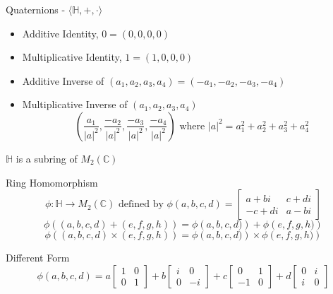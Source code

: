 \documentclass{beamer}
\begin{document}
\begin{frame}{Quaternions - $\langle \mathbb{H},+,\cdot \rangle$}
\begin{itemize}
		\item<4> Additive Identity, $0 = (0,0,0,0)$
		\item<4> Multiplicative Identity, $1 = (1,0,0,0)$
		\item<4> Additive Inverse of $(a_1,a_2,a_3,a_4) = (-a_1,-a_2,-a_3,-a_4)$
		\item<4> Multiplicative Inverse of $(a_1,a_2,a_3,a_4)$
		$$\left(\frac{a_1}{|a|^2},\frac{-a_2}{|a|^2},\frac{-a_3}{|a|^2},\frac{-a_4}{|a|^2}\right) \text{ where } |a|^2 = a_1^2+a_2^2+a_3^2+ a_4^2$$
\end{itemize}
\end{frame}

\begin{frame}{$\mathbb{H}$ is a subring of $M_2(\mathbb{C})$}
\begin{block}{Ring Homomorphism}
	$$ \phi : \mathbb{H} \to M_2(\mathbb{C}) \text{ defined by } \phi(a,b,c,d) = \begin{bmatrix} a+bi & c+di \\ -c+di & a-bi \end{bmatrix}$$
	$$\phi\left( (a,b,c,d) + (e,f,g,h) \right) = \phi\left(a,b,c,d)\right) + \phi\left(e,f,g,h)\right)$$
	$$\phi\left( (a,b,c,d) \times (e,f,g,h) \right) = \phi\left(a,b,c,d)\right) \times \phi\left(e,f,g,h)\right)$$
\end{block}
\begin{block}{Different Form}
	$$ \phi(a,b,c,d) = a\begin{bmatrix} 1 & 0 \\ 0 & 1 \end{bmatrix} + b\begin{bmatrix}i & 0 \\ 0 & -i \end{bmatrix} + c\begin{bmatrix}0 & 1 \\ -1 & 0 \end{bmatrix} + d\begin{bmatrix}0 & i \\ i & 0 \end{bmatrix}$$
\end{block}
\end{frame}
\end{document}

